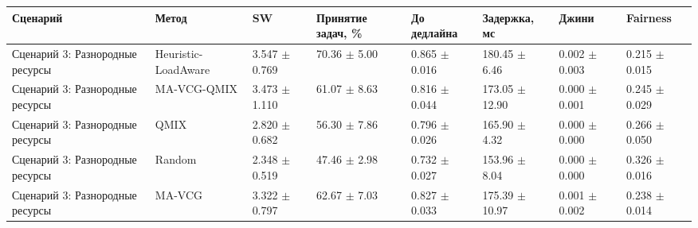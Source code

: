 \begin{tabular}{llllllll}
\toprule
Сценарий & Метод & SW & Принятие задач, \% & До дедлайна & Задержка, мс & Джини & Fairness \\
\midrule
Сценарий 3: Разнородные ресурсы & Heuristic-LoadAware & 3.547 $\pm$ 0.769 & 70.36 $\pm$ 5.00 & 0.865 $\pm$ 0.016 & 180.45 $\pm$ 6.46 & 0.002 $\pm$ 0.003 & 0.215 $\pm$ 0.015 \\
Сценарий 3: Разнородные ресурсы & MA-VCG-QMIX & 3.473 $\pm$ 1.110 & 61.07 $\pm$ 8.63 & 0.816 $\pm$ 0.044 & 173.05 $\pm$ 12.90 & 0.000 $\pm$ 0.001 & 0.245 $\pm$ 0.029 \\
Сценарий 3: Разнородные ресурсы & QMIX & 2.820 $\pm$ 0.682 & 56.30 $\pm$ 7.86 & 0.796 $\pm$ 0.026 & 165.90 $\pm$ 4.32 & 0.000 $\pm$ 0.000 & 0.266 $\pm$ 0.050 \\
Сценарий 3: Разнородные ресурсы & Random & 2.348 $\pm$ 0.519 & 47.46 $\pm$ 2.98 & 0.732 $\pm$ 0.027 & 153.96 $\pm$ 8.04 & 0.000 $\pm$ 0.000 & 0.326 $\pm$ 0.016 \\
Сценарий 3: Разнородные ресурсы & MA-VCG & 3.322 $\pm$ 0.797 & 62.67 $\pm$ 7.03 & 0.827 $\pm$ 0.033 & 175.39 $\pm$ 10.97 & 0.001 $\pm$ 0.002 & 0.238 $\pm$ 0.014 \\
\bottomrule
\end{tabular}
